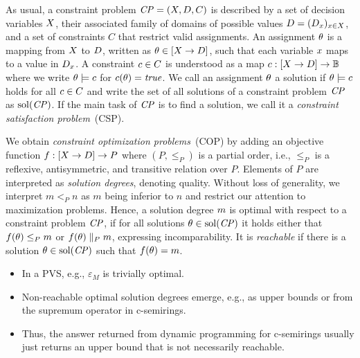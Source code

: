 As usual, a constraint problem $\mathit{CP} = (X, D, C)$ is described
by a set of decision variables $X$, their associated family of domains of possible values
$D = (D_x)_{x \in X}$, and a set of constraints $C$ that restrict valid assignments.
An assignment $\theta$ is a mapping from $X$ to $D$, written as $\theta \in [X \to D]$, such that each variable $x$ maps to
a value in $D_x$. A constraint $c \in C$ is understood as a map $c : [X \to D] \to \mathbb{B}$
where we write $\theta \models c$ for $c(\theta) = \mathit{true}$. We call
an assignment $\theta$ a solution if $\theta \models c$ holds for all $c \in C$ and
write the set of all solutions of a constraint problem $\mathit{CP}$ as $\mathrm{sol}(\mathit{CP})$. If the main task of $\mathit{CP}$ is
to find a solution, we call it a \emph{constraint satisfaction problem}~(CSP).

We obtain \emph{constraint optimization problems}~(COP) by adding an objective function $f : [X \to D] \to P$
where $(P, \leq_P)$ is a partial order, i.e., $\leq_P$ is a reflexive, antisymmetric, and transitive relation over $P$.
Elements of $P$ are interpreted as \emph{solution degrees}, denoting quality. Without loss of generality, we interpret
$m <_P n$ as $m$ being inferior to $n$ and restrict our attention to maximization problems.
Hence, a solution degree $m$ is optimal with respect to a constraint problem $\mathit{CP}$, 
if for all solutions $\theta \in \mathrm{sol}(\mathit{CP})$ it holds either that $f(\theta) \leq_P m$ or 
$f(\theta) \parallel_P m$, expressing incomparability.  It is \emph{reachable} if there is a solution $\theta \in \mathrm{sol}(\mathit{CP})$ such that 
$f(\theta) = m$. 

\begin{itemize}
\item In a PVS, e.g., $\varepsilon_M$ is trivially optimal.
\item Non-reachable optimal solution degrees emerge, e.g., as
 upper bounds or from the supremum operator in c-semirings. 
\item Thus, the answer returned from dynamic programming for c-semirings
usually just returns an upper bound that is not necessarily reachable.

\end{itemize}

